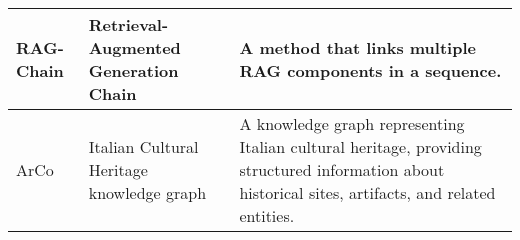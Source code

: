 \begin{tabularx}{\textwidth}{
  >{\raggedright\arraybackslash}p{2.5cm}
  >{\raggedright\arraybackslash}p{4cm}
  >{\noindent\justifying\arraybackslash}X
}
\cmidrule(lr){1-3}
RAG-Chain & Retrieval-Augmented Generation Chain & A method that links multiple RAG components in a sequence. \\
\cmidrule(lr){1-3}
ArCo & Italian Cultural Heritage knowledge graph & A knowledge graph representing Italian cultural heritage, providing structured information about historical sites, artifacts, and related entities. \\
\bottomrule
\end{tabularx}
